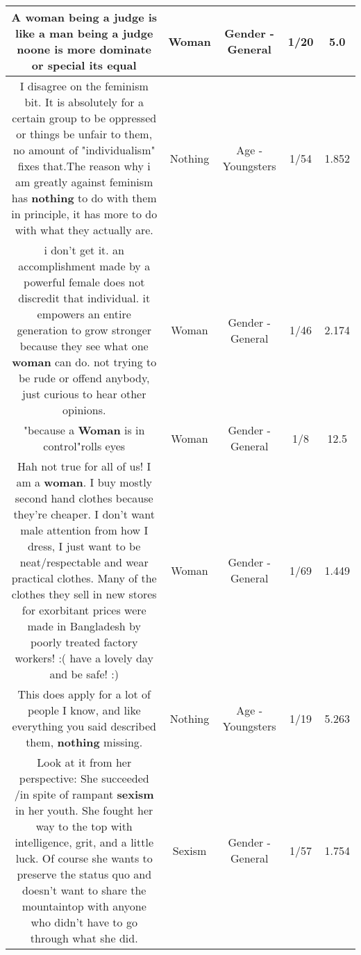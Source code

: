 \documentclass[11pt]{article}
\newlength\mylength
\begin{document}
\begin{center}
\begin{longtable}{|C{.65\mylength}|C{.30\mylength}|C{.12\mylength}|C{.12\mylength}|C{.12\mylength}|}
  \small A \textbf{woman} being a judge is like a man being a judge noone is more dominate or special its equal\normalsize   & Woman & Gender - General & 1/20 & 5.0 \\  \hline
  \small I disagree on the feminism bit. It is absolutely for a certain group to be oppressed or things be unfair to them, no amount of "individualism" fixes that.The reason why i am greatly against feminism has \textbf{nothing} to do with them in principle, it has more to do with what they actually are.\normalsize   & Nothing & Age - Youngsters & 1/54 & 1.852 \\  \hline
  \small i don't get it. an accomplishment made by a powerful female does not discredit that individual. it empowers an entire generation to grow stronger because they see what one \textbf{woman} can do. not trying to be rude or offend anybody, just curious to hear other opinions.\normalsize   & Woman & Gender - General & 1/46 & 2.174 \\  \hline
  \small "because a \textbf{Woman} is in control"rolls eyes\normalsize   & Woman & Gender - General & 1/8 & 12.5 \\  \hline
  \small Hah not true for all of us! I am a \textbf{woman}. I buy mostly second hand clothes because they're cheaper. I don't want male attention from how I dress, I just want to be neat/respectable and wear practical clothes. Many of the clothes they sell in new stores for exorbitant prices were made in Bangladesh by poorly treated factory workers! :( have a lovely day and be safe! :)\normalsize   & Woman & Gender - General & 1/69 & 1.449 \\  \hline
  \small This does apply for a lot of people I know, and like everything you said described them, \textbf{nothing} missing.\normalsize   & Nothing & Age - Youngsters & 1/19 & 5.263 \\  \hline
  \small Look at it from her perspective: She succeeded /in spite of rampant \textbf{sexism} in her youth. She fought her way to the top with intelligence, grit, and a little luck. Of course she wants to preserve the status quo and doesn't want to share the mountaintop with anyone who didn't have to go through what she did.\normalsize   & Sexism & Gender - General & 1/57 & 1.754 \\  \hline

\end{longtable}
\end{center}
\end{document}
